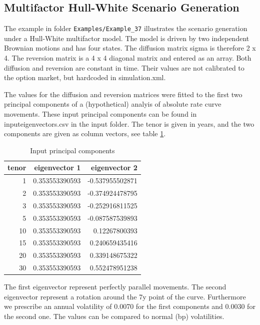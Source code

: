 \documentclass[12pt, a4paper]{article}
\begin{document}
\subsection{Multifactor Hull-White Scenario Generation}%
\label{example:37}

The example in folder {\tt Examples/Example\_37} illustrates the scenario generation under a Hull-White multifactor
model. The model is driven by two independent Brownian motions and has four states. The diffusion matrix sigma is
therefore 2 x 4. The reversion matrix is a 4 x 4 diagonal matrix and entered as an array. Both diffusion and reversion
are constant in time. Their values are not calibrated to the option market, but hardcoded in simulation.xml.

The values for the diffusion and reversion matrices were fitted to the first two principal components of a
(hypothetical) analyis of absolute rate curve movements. These input principal components can be found in
inputeigenvectors.csv in the input folder. The tenor is given in years, and the two components are given as column
vectors, see table \ref{tab:ex37_1}.

\begin{table}[hbt]
\begin{center}
\begin{tabular}{r|r|r}
tenor & eigenvector 1  & eigenvector 2   \\
\hline      
1     & 0.353553390593 & -0.537955502871 \\
2     & 0.353553390593 & -0.374924478795 \\
3     & 0.353553390593 & -0.252916811525 \\
5     & 0.353553390593 & -0.087587539893 \\
10    & 0.353553390593 & 0.12267800393   \\
15    & 0.353553390593 & 0.240659435416  \\
20    & 0.353553390593 & 0.339148675322  \\
30    & 0.353553390593 & 0.552478951238
\end{tabular}
\caption{Input principal components}
\label{tab:ex37_1}
\end{center}
\end{table}

The first eigenvector represent perfectly parallel movements. The second eigenvector represent a rotation around the 7y
point of the curve. Furthermore we prescribe an annual volatility of 0.0070 for the first components and 0.0030 for the
second one. The values can be compared to normal (bp) volatilities.
\end{document}
